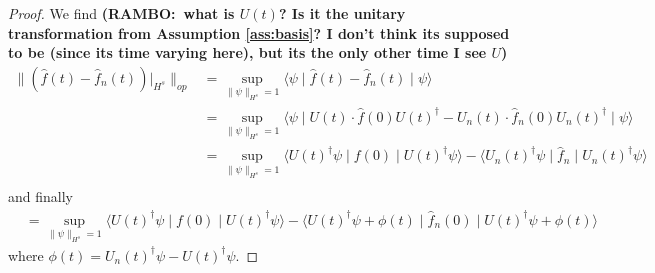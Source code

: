 \documentclass[final,leqno]{siamltex1213}
\newcommand{\ram}[1]{{\normalsize{\textbf{({\color{red}RAMBO:\ }#1)}}}}
\begin{document}
\begin{proof}
	We find \ram{what is $U(t)$? Is it the unitary transformation from Assumption \ref{ass:basis}? I don't think its supposed to be (since its time varying here), but its the only other time I see $U$}
	\begin{align}
		\| ( \hat{f}(t) - \hat{f}_{n}(t))|_{H^{s}} \|_{op} &= \sup_{\| \psi \|_{H^{s}} =1} \langle \psi \mid \hat{f}(t) - \hat{f}_{n}(t) \mid \psi \rangle \\
			&= \sup_{ \| \psi \|_{H^{s}} =1} \langle \psi \mid U(t) \cdot \hat{f}(0) U(t)^{\dagger} - U_{n}(t) \cdot \hat{f}_{n}(0) U_{n}(t)^{\dagger} \mid \psi \rangle \\
			&= \sup_{ \| \psi \|_{H^{s}} =1 } \langle U(t)^{\dagger} \psi \mid f(0) \mid U(t)^{\dagger} \psi \rangle 
				- \langle U_{n}(t)^{\dagger} \psi \mid \hat{f}_{n} \mid U_{n}(t)^{\dagger} \psi \rangle\\
	\end{align}
	and finally
	\begin{align}
			&= \sup_{ \| \psi \|_{H^{s}} = 1} \langle U(t)^{\dagger} \psi \mid f(0) \mid U(t)^{\dagger} \psi \rangle 
			- \langle U(t)^{\dagger} \psi + \phi(t) \mid \hat{f}_{n}(0) \mid  U(t)^{\dagger} \psi + \phi(t) \rangle \label{eq:final line}
	\end{align}
	where $\phi(t) = U_{n}(t)^{\dagger} \psi - U(t)^{\dagger} \psi$.
	

\end{proof}
\end{document}
